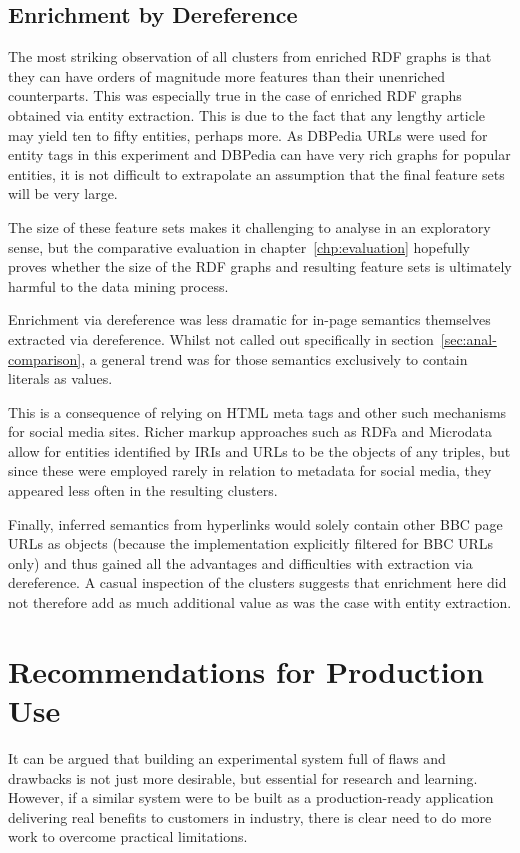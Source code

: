\subsection{Enrichment by Dereference}

The most striking observation of all clusters from enriched RDF
graphs is that they can have orders of magnitude more features than
their unenriched counterparts. This was especially true in the case
of enriched RDF graphs obtained via entity extraction. This is due
to the fact that any lengthy article may yield ten to fifty entities,
perhaps more. As DBPedia URLs were used for entity tags in this
experiment and DBPedia can have very rich graphs for popular entities,
it is not difficult to extrapolate an assumption that the final
feature sets will be very large.

The size of these feature sets makes it challenging to analyse in an
exploratory sense, but the comparative evaluation in
chapter~\ref{chp:evaluation} hopefully proves whether the size of the
RDF graphs and resulting feature sets is ultimately harmful to the
data mining process.

Enrichment via dereference was less dramatic for in-page semantics
themselves extracted via dereference. Whilst not called out
specifically in section~\ref{sec:anal-comparison}, a general trend
was for those semantics exclusively to contain literals as values.

This is a consequence of relying on HTML meta tags and other such
mechanisms for social media sites. Richer markup approaches such
as RDFa and Microdata allow for entities identified by IRIs and URLs
to be the objects of any triples, but since these were employed
rarely in relation to metadata for social media, they appeared
less often in the resulting clusters.

Finally, inferred semantics from hyperlinks would solely contain
other BBC page URLs as objects (because the implementation explicitly
filtered for BBC URLs only) and thus gained all the advantages and
difficulties with extraction via dereference. A casual inspection
of the clusters suggests that enrichment here did not therefore add
as much additional value as was the case with entity extraction.

\section{Recommendations for Production Use}

It can be argued that building an experimental system full of flaws
and drawbacks is not just more desirable, but essential for research
and learning.
However, if a similar system were to be built as a production-ready
application delivering real benefits to customers in industry, there
is clear need to do more work to overcome practical limitations.

